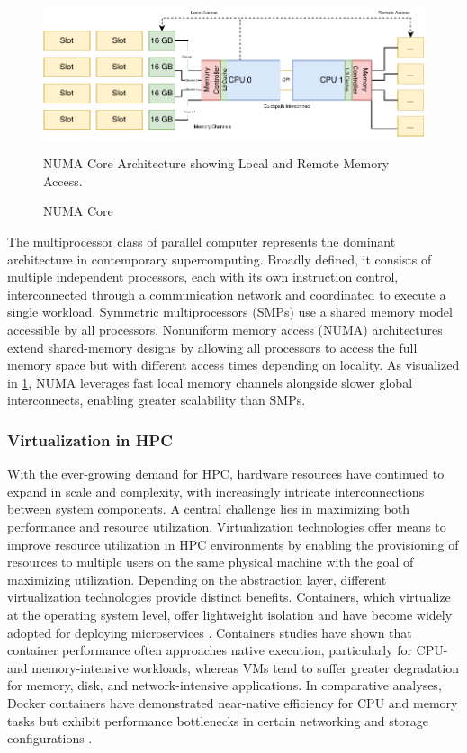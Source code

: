 \begin{figure}[H]
    \centering
    \includegraphics[scale=0.9]{fig/02/02-numa-cores.pdf}
    \caption{NUMA Core}
    \label{fig:02-numa-cores}
    \tiny
    NUMA Core Architecture showing Local and Remote Memory Access.
\end{figure}

The multiprocessor class of parallel computer represents the dominant architecture in contemporary supercomputing. Broadly defined, it consists of multiple independent processors, each with its own instruction control, interconnected through a communication network and coordinated to execute a single workload. Symmetric multiprocessors (SMPs) use a shared memory model accessible by all processors. Nonuniform memory access (NUMA) architectures extend shared-memory designs by allowing all processors to access the full memory space but with different access times depending on locality. As visualized in \ref{fig:02-numa-cores}, NUMA leverages fast local memory channels alongside slower global interconnects, enabling greater scalability than SMPs.

\subsubsection{Virtualization in HPC}
\label{sec:background_hpc_virtualization}
With the ever-growing demand for HPC, hardware resources have continued to expand in scale and complexity, with increasingly intricate interconnections between system components. A central challenge lies in maximizing both performance and resource utilization. Virtualization technologies offer means to improve resource utilization in HPC environments by enabling the provisioning of resources to multiple users on the same physical machine with the goal of maximizing utilization. Depending on the abstraction layer, different virtualization technologies provide distinct benefits. Containers, which virtualize at the operating system level, offer lightweight isolation and have become widely adopted for deploying microservices \cite{9653557}.
Containers studies have shown that container performance often approaches native execution, particularly for CPU- and memory-intensive workloads, whereas VMs tend to suffer greater degradation for memory, disk, and network-intensive applications. In comparative analyses, Docker containers have demonstrated near-native efficiency for CPU and memory tasks but exhibit performance bottlenecks in certain networking and storage configurations \cite{8397647}.

